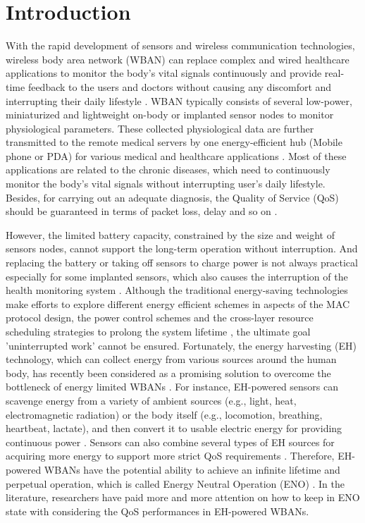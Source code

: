 \documentclass[journal,10pt]{IEEEtran}
\begin{document}
\section{Introduction}
With the rapid development of sensors and wireless communication technologies, wireless body area network (WBAN) can replace complex and wired healthcare applications to monitor the body's vital signals continuously and provide real-time feedback to the users and doctors without causing any discomfort and interrupting their daily lifestyle \cite{salayma2017wireless,movassaghi2014wireless,dagdeviren2017energy}. 
WBAN typically consists of several low-power, miniaturized and lightweight on-body or implanted sensor nodes to monitor physiological parameters. These collected physiological data are further transmitted to the remote medical servers by one energy-efficient hub (Mobile phone or PDA) for various medical and healthcare applications \cite{zhang2017medium}. 
Most of these applications are related to the chronic diseases, which need to continuously monitor the body's vital signals without interrupting user's daily lifestyle. Besides, for carrying out an adequate diagnosis, the Quality of Service (QoS) should be guaranteed in terms of packet loss, delay and so on \cite{razzaque2017qos}. 

However, the limited battery capacity, constrained by the size and weight of sensors nodes, cannot support the long-term operation without interruption. And replacing the battery or taking off sensors to charge power is not always practical especially for some implanted sensors, which also causes the interruption of the health monitoring system \cite{ibarra2016qos,luo2017resource}. Although the traditional energy-saving technologies make efforts to explore different energy efficient schemes in aspects of the MAC protocol design, the power control schemes and the cross-layer resource scheduling strategies to prolong the system lifetime \cite{zhang2017medium,zang2016accelerometer,liu2017transmission}, the ultimate goal 'uninterrupted work' cannot be ensured. 
Fortunately, the energy harvesting (EH) technology, which can collect energy from various sources around the human body, has recently been considered as a promising solution to overcome the bottleneck of energy limited WBANs \cite{hao2017energy}. For instance, EH-powered sensors can scavenge energy from a variety of ambient sources (e.g., light, heat, electromagnetic radiation) or the body itself (e.g., locomotion, breathing, heartbeat, lactate), and then convert it to usable electric energy for providing continuous power \cite{akhtar2017energy}. 
Sensors can also combine several types of EH sources for acquiring more energy to support more strict QoS requirements \cite{ibarra2016qos}.
Therefore, EH-powered WBANs have the potential ability to achieve an infinite lifetime and perpetual operation, which is called Energy Neutral Operation (ENO) \cite{kansal2007power}.
In the literature, researchers have paid more and more attention on how to keep in ENO state with considering the QoS performances in EH-powered WBANs.
\end{document}
